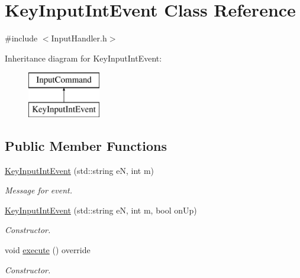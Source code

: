 \hypertarget{class_key_input_int_event}{\section{Key\+Input\+Int\+Event Class Reference}
\label{class_key_input_int_event}
}


{\ttfamily \#include $<$Input\+Handler.\+h$>$}

Inheritance diagram for Key\+Input\+Int\+Event\+:\begin{figure}[H]
\begin{center}
\leavevmode
\includegraphics[height=2.000000cm]{class_key_input_int_event}
\end{center}
\end{figure}
\subsection*{Public Member Functions}
\begin{DoxyCompactItemize}
\item 
\hypertarget{class_key_input_int_event_ab0dc443f0aa8131afc0ef8c27a7e0d05}{\hyperlink{class_key_input_int_event_ab0dc443f0aa8131afc0ef8c27a7e0d05}{Key\+Input\+Int\+Event} (std\+::string e\+N, int m)}\label{class_key_input_int_event_ab0dc443f0aa8131afc0ef8c27a7e0d05}

\begin{DoxyCompactList}\small\item\em Message for event. \end{DoxyCompactList}\item 
\hypertarget{class_key_input_int_event_a4985a95069905f4f2b28bbf04f4050af}{\hyperlink{class_key_input_int_event_a4985a95069905f4f2b28bbf04f4050af}{Key\+Input\+Int\+Event} (std\+::string e\+N, int m, bool on\+Up)}\label{class_key_input_int_event_a4985a95069905f4f2b28bbf04f4050af}

\begin{DoxyCompactList}\small\item\em Constructor. \end{DoxyCompactList}\item 
void \hyperlink{class_key_input_int_event_af50e070eb50e9204ef0f1d6d8cfec4ba}{execute} () override
\begin{DoxyCompactList}\small\item\em Constructor. \end{DoxyCompactList}\end{DoxyCompactItemize}
